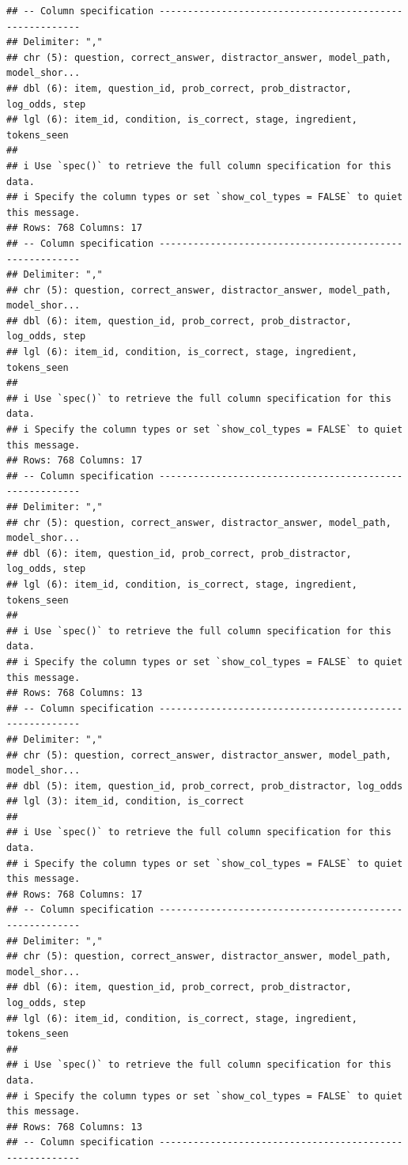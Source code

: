 \documentclass[
]{article}
\begin{document}
\begin{verbatim}
## -- Column specification --------------------------------------------------------
## Delimiter: ","
## chr (5): question, correct_answer, distractor_answer, model_path, model_shor...
## dbl (6): item, question_id, prob_correct, prob_distractor, log_odds, step
## lgl (6): item_id, condition, is_correct, stage, ingredient, tokens_seen
## 
## i Use `spec()` to retrieve the full column specification for this data.
## i Specify the column types or set `show_col_types = FALSE` to quiet this message.
## Rows: 768 Columns: 17
## -- Column specification --------------------------------------------------------
## Delimiter: ","
## chr (5): question, correct_answer, distractor_answer, model_path, model_shor...
## dbl (6): item, question_id, prob_correct, prob_distractor, log_odds, step
## lgl (6): item_id, condition, is_correct, stage, ingredient, tokens_seen
## 
## i Use `spec()` to retrieve the full column specification for this data.
## i Specify the column types or set `show_col_types = FALSE` to quiet this message.
## Rows: 768 Columns: 17
## -- Column specification --------------------------------------------------------
## Delimiter: ","
## chr (5): question, correct_answer, distractor_answer, model_path, model_shor...
## dbl (6): item, question_id, prob_correct, prob_distractor, log_odds, step
## lgl (6): item_id, condition, is_correct, stage, ingredient, tokens_seen
## 
## i Use `spec()` to retrieve the full column specification for this data.
## i Specify the column types or set `show_col_types = FALSE` to quiet this message.
## Rows: 768 Columns: 13
## -- Column specification --------------------------------------------------------
## Delimiter: ","
## chr (5): question, correct_answer, distractor_answer, model_path, model_shor...
## dbl (5): item, question_id, prob_correct, prob_distractor, log_odds
## lgl (3): item_id, condition, is_correct
## 
## i Use `spec()` to retrieve the full column specification for this data.
## i Specify the column types or set `show_col_types = FALSE` to quiet this message.
## Rows: 768 Columns: 17
## -- Column specification --------------------------------------------------------
## Delimiter: ","
## chr (5): question, correct_answer, distractor_answer, model_path, model_shor...
## dbl (6): item, question_id, prob_correct, prob_distractor, log_odds, step
## lgl (6): item_id, condition, is_correct, stage, ingredient, tokens_seen
## 
## i Use `spec()` to retrieve the full column specification for this data.
## i Specify the column types or set `show_col_types = FALSE` to quiet this message.
## Rows: 768 Columns: 13
## -- Column specification --------------------------------------------------------

\end{verbatim}
\end{document}
